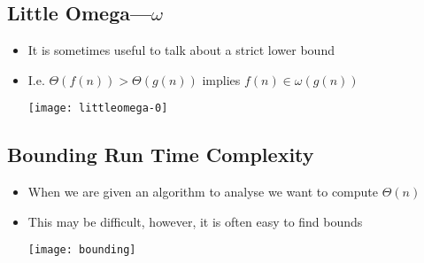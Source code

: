 
\begin{slide}
\section{Little Omega---$\omega$}

\begin{PauseHighLight}
  \begin{itemize}
  \item It is sometimes useful to talk about a strict lower bound\pause
  \item I.e. $\Theta(f(n)) > \Theta(g(n))$ implies $f(n) \in
    \omega(g(n))$
    \begin{center}
      \texttt{[image: littleomega-0]}\pause
    \end{center}
  \end{itemize}
\end{PauseHighLight}

\end{slide}


\begin{slide}
\section[-1]{Bounding Run Time Complexity}

\begin{PauseHighLight}
  \begin{itemize}
  \item When we are given an algorithm to analyse we want to compute
    $\Theta(n)$\pause
  \item This may be difficult, however, it is often easy to find bounds
    \begin{center}
      \texttt{[image: bounding]}\pause
    \end{center}
  \end{itemize}
\end{PauseHighLight}

\end{slide}



